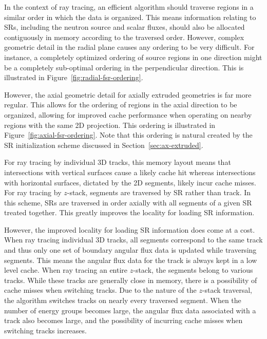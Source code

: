 
In the context of ray tracing, an efficient algorithm should traverse regions in a similar order in which the data is organized. This means information relating to \ac{SR}s, including the neutron source and scalar fluxes, should also be allocated contiguously in memory according to the traversed order. However, complex geometric detail in the radial plane causes any ordering to be very difficult. For instance, a completely optimized ordering of source regions in one direction might be a completely sub-optimal ordering in the perpendicular direction. This is illustrated in Figure~\ref{fig:radial-fsr-ordering}.

However, the axial geometric detail for axially extruded geometries is far more regular. This allows for the ordering of regions in the axial direction to be organized, allowing for improved cache performance when operating on nearby regions with the same 2D projection. This ordering is illustrated in Figure~\ref{fig:axial-fsr-ordering}. Note that this ordering is natural created by the \ac{SR} initialization scheme discussed in Section~\ref{sec:ax-extruded}.

For ray tracing by individual 3D tracks, this memory layout means that intersections with vertical surfaces cause a likely cache hit whereas intersections with horizontal surfaces, dictated by the 2D segments, likely incur cache misses. For ray tracing by $z$-stack, segments are traversed by \ac{SR} rather than track. In this scheme, \ac{SR}s are traversed in order axially with all segments of a given \ac{SR} treated together. This greatly improves the locality for loading \ac{SR} information.

However, the improved locality for loading \ac{SR} information does come at a cost. When ray tracing individual 3D tracks, all segments correspond to the same track and thus only one set of boundary angular flux data is updated while traversing segments. This means the angular flux data for the track is always kept in a low level cache. When ray tracing an entire $z$-stack, the segments belong to various tracks. While these tracks are generally close in memory, there is a possibility of cache misses when switching tracks. Due to the nature of the $z$-stack traversal, the algorithm switches tracks on nearly every traversed segment. When the number of energy groups becomes large, the angular flux data associated with a track also becomes large, and the possibility of incurring cache misses when switching tracks increases.

